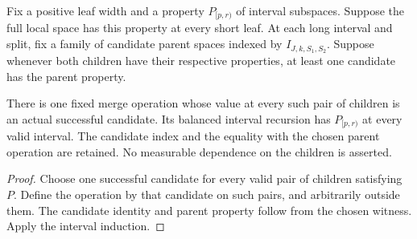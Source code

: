 \begin{lemma}
    \label{lem:balanced_interval_choice}
    \leanok
    Fix a positive leaf width and a property $P_{[p,r)}$ of interval
    subspaces. Suppose the full local space has this property at every
    short leaf. At each long interval and split, fix a family of candidate
    parent spaces indexed by $I_{J,k,S_1,S_2}$. Suppose whenever both
    children have their respective properties, at least one candidate has
    the parent property.

    There is one fixed merge operation whose value at every such pair of
    children is an actual successful candidate. Its balanced interval
    recursion has $P_{[p,r)}$ at every valid interval. The candidate index
    and the equality with the chosen parent operation are retained.
    No measurable dependence on the children is asserted.
\end{lemma}
\begin{proof}\leanok
    Choose one successful candidate for every valid pair of children
    satisfying $P$. Define the operation by that candidate on such pairs,
    and arbitrarily outside them. The candidate identity and parent
    property follow from the chosen witness. Apply the interval induction.
\end{proof}

